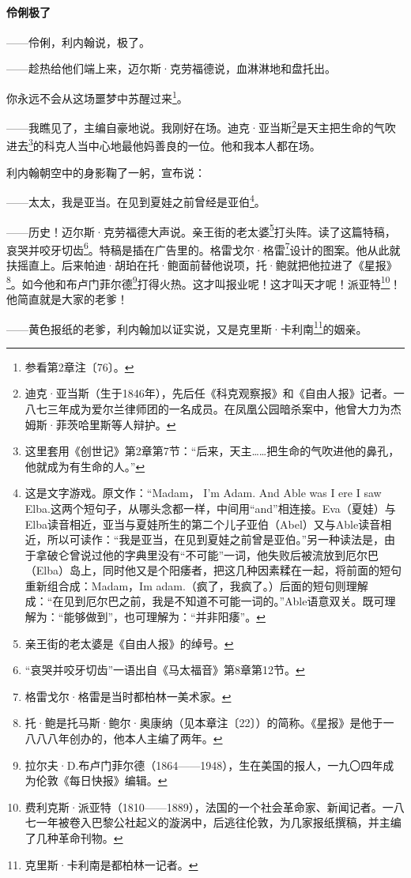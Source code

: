 \paragraph*{伶俐极了}
\par ——伶俐，利内翰说，极了。
\par ——趁热给他们端上来，迈尔斯·克劳福德说，血淋淋地和盘托出。
\par 你永远不会从这场噩梦中苏醒过来\footnote{参看第2章注〔76〕。}。
\par ——我瞧见了，主编自豪地说。我刚好在场。迪克·亚当斯\footnote{迪克·亚当斯（生于1846年），先后任《科克观察报》和《自由人报》记者。一八七三年成为爱尔兰律师团的一名成员。在凤凰公园暗杀案中，他曾大力为杰姆斯·菲茨哈里斯等人辩护。}是天主把生命的气吹进去\footnote{这里套用《创世记》第2章第7节：“后来，天主……把生命的气吹进他的鼻孔，他就成为有生命的人。”}的科克人当中心地最他妈善良的一位。他和我本人都在场。
\par 利内翰朝空中的身影鞠了一躬，宣布说：
\par ——太太，我是亚当。在见到夏娃之前曾经是亚伯\footnote{这是文字游戏。原文作：“Madam， I’m Adam. And Able was I ere I saw Elba.这两个短句子，从哪头念都一样，中间用“and”相连接。Eva（夏娃）与Elba读音相近，亚当与夏娃所生的第二个儿子亚伯（Abel）又与Able读音相近，所以可读作：“我是亚当，在见到夏娃之前曾是亚伯。”另一种读法是，由于拿破仑曾说过他的字典里没有“不可能”一词，他失败后被流放到厄尔巴（Elba）岛上，同时他又是个阳痿者，把这几种因素糅在一起，将前面的短句重新组合成：Madam，Im adam.（疯了，我疯了。）后面的短句则理解成：“在见到厄尔巴之前，我是不知道不可能一词的。”Able语意双关。既可理解为：“能够做到”，也可理解为：“并非阳痿”。}。
\par ——历史！迈尔斯·克劳福德大声说。亲王街的老太婆\footnote{亲王街的老太婆是《自由人报》的绰号。}打头阵。读了这篇特稿，哀哭并咬牙切齿\footnote{“哀哭并咬牙切齿”一语出自《马太福音》第8章第12节。}。特稿是插在广告里的。格雷戈尔·格雷\footnote{格雷戈尔·格雷是当时都柏林一美术家。}设计的图案。他从此就扶摇直上。后来帕迪·胡珀在托·鲍面前替他说项，托·鲍就把他拉进了《星报》\footnote{托·鲍是托马斯·鲍尔·奥康纳（见本章注〔22〕）的简称。《星报》是他于一八八八年创办的，他本人主编了两年。}。如今他和布卢门菲尔德\footnote{拉尔夫·D.布卢门菲尔德（1864——1948），生在美国的报人，一九〇四年成为伦敦《每日快报》编辑。}打得火热。这才叫报业呢！这才叫天才呢！派亚特\footnote{费利克斯·派亚特（1810——1889），法国的一个社会革命家、新闻记者。一八七一年被卷入巴黎公社起义的漩涡中，后逃往伦敦，为几家报纸撰稿，并主编了几种革命刊物。}！他简直就是大家的老爹！
\par ——黄色报纸的老爹，利内翰加以证实说，又是克里斯·卡利南\footnote{克里斯·卡利南是都柏林一记者。}的姻亲。
